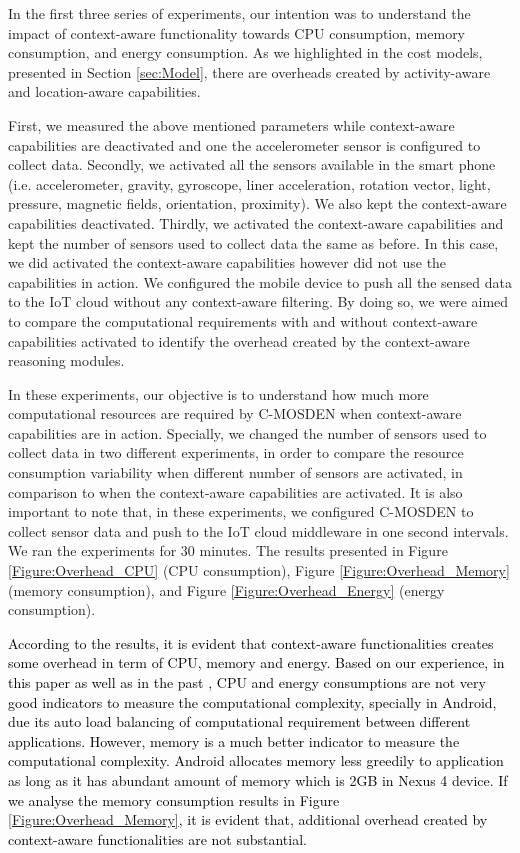 \documentclass[journal]{IEEEtran}
\begin{document}
In the first three series of experiments, our intention was to understand the impact of context-aware functionality towards CPU consumption, memory consumption, and energy consumption. As we highlighted in the cost models, presented in Section \ref{sec:Model}, there are overheads created by activity-aware and location-aware capabilities. 

First, we measured the above mentioned parameters while context-aware capabilities are deactivated and one the accelerometer sensor is configured to collect data. Secondly, we activated all the sensors available in the smart phone (i.e. accelerometer, gravity, gyroscope, liner acceleration, rotation vector,  light, pressure,  magnetic fields, orientation, proximity). We also kept the  context-aware capabilities deactivated. Thirdly, we activated the context-aware capabilities and kept the number of sensors used to collect data the same as before. In this case, we did activated the context-aware capabilities however did not use the capabilities in action. We configured the mobile device to push all the sensed data to the IoT cloud without any context-aware filtering. By doing so, we were aimed to compare the computational requirements with and without context-aware capabilities activated to identify the overhead created by the context-aware reasoning modules.

In these experiments, our objective is to understand how much more computational resources are required by C-MOSDEN when context-aware capabilities are in action. Specially, we changed the number of sensors used to collect data in two different experiments, in order to compare the resource consumption variability when different number of sensors are activated, in comparison to when the context-aware capabilities are activated. It is also important to note that, in these experiments, we configured C-MOSDEN to collect sensor data and push to the IoT cloud middleware in one second intervals. We ran the experiments for 30 minutes. The results presented in  Figure \ref{Figure:Overhead_CPU} (CPU consumption), Figure \ref{Figure:Overhead_Memory} (memory consumption), and Figure \ref{Figure:Overhead_Energy} (energy consumption).


\textcolor{black}{According to the results, it is evident that context-aware functionalities creates some overhead in term of CPU, memory and energy. Based on our experience, in this paper as well as in the past \cite{ZMC008}, CPU and energy consumptions are not very good indicators to measure the computational complexity, specially in Android, due its auto load balancing of computational requirement between different applications. However, memory is  a much better  indicator to measure the computational complexity. Android allocates memory less greedily to application as long as it has abundant amount of memory which is 2GB in Nexus 4 device. If we analyse the memory consumption results in Figure \ref{Figure:Overhead_Memory}, it is evident that, additional overhead created by context-aware functionalities are not substantial.}
\end{document}
